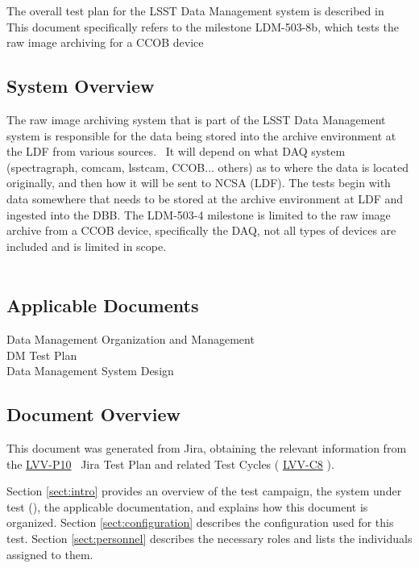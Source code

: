 \documentclass[DM,STR,toc]{lsstdoc}
\begin{document}
The overall test plan for the LSST Data Management system is described
in \\
This document specifically refers to the milestone LDM-503-8b, which
tests the raw image archiving for a CCOB device



\subsection{System Overview}
\label{sect:systemoverview}

The raw image archiving system that is part of the LSST Data Management
system is responsible for the data being stored into the archive
environment at the LDF from various sources. ~It will depend on what DAQ
system (spectragraph, comcam, lsstcam, CCOB... others) as to where the
data is located originally, and then how it will be sent to NCSA (LDF).
The tests begin with data somewhere that needs to be stored at the
archive environment at LDF and ingested into the DBB. The LDM-503-4
milestone is limited to the raw image archive from a CCOB device,
specifically the DAQ, not all types of devices are included and is
limited in scope.\\
~\\

\hypertarget{applicable-documents}{%
\subsection{Applicable Documents}\label{applicable-documents}}

 Data Management Organization and Management\\
 DM Test Plan\\
 Data Management System Design


\subsection{Document Overview}
\label{sect:docoverview}

This document was generated from Jira, obtaining the relevant information from the 
\href{https://jira.lsstcorp.org/secure/Tests.jspa#/testPlan/LVV-P10}{LVV-P10}
~Jira Test Plan and related Test Cycles (
  \href{https://jira.lsstcorp.org/secure/Tests.jspa#/testCycle/LVV-C8}{LVV-C8}
).

Section \ref{sect:intro} provides an overview of the test campaign, the system under test (\product{}), the applicable documentation, and explains how this document is organized.
Section \ref{sect:configuration}  describes the configuration used for this test.
Section \ref{sect:personnel} describes the necessary roles and lists the individuals assigned to them.
\end{document}
